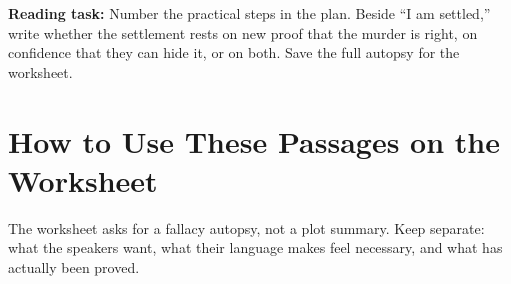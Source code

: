 \documentclass[12pt]{article}
\begin{document}
\textbf{Reading task:} Number the practical steps in the plan. Beside ``I am settled,'' write whether the settlement rests on new proof that the murder is right, on confidence that they can hide it, or on both. Save the full autopsy for the worksheet.

\section*{How to Use These Passages on the Worksheet}

The worksheet asks for a fallacy autopsy, not a plot summary. Keep separate: what the speakers want, what their language makes feel necessary, and what has actually been proved.
\end{document}
